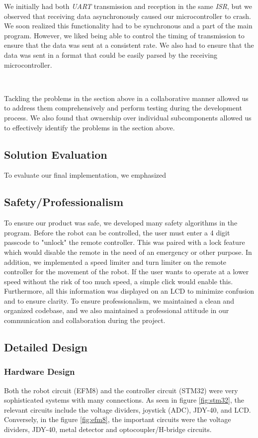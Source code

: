 \documentclass{article}
\begin{document}
We initially had both \textit{UART} transmission and reception in the same \textit{ISR}, but we observed that receiving data asynchronously
caused our microcontroller to crash. We soon realized this functionality had to be synchronous and a part of the main program. However, we liked being able to control the timing of
transmission to ensure that the data was sent at a consistent rate. We also had to ensure that the data was sent in a format that could be easily parsed by the receiving microcontroller.

\

Tackling the problems in the section above in a collaborative manner allowed us to address them comprehensively and perform
testing during the development process. We also found that ownership over individual subcomponents allowed us to effectively identify the problems in the section above.

\subsection{Solution Evaluation}

To evaluate our final implementation, we emphasized

\subsection{Safety/Professionalism}

To ensure our product was safe, we developed many safety algorithms in the program. Before the robot can be controlled, the user must enter a 4 digit passcode to "unlock" the remote controller. This was paired with a lock feature which would disable the remote in the need of an emergency or other purpose.
In addition, we implemented a speed limiter and turn limiter on the remote controller for the movement of the robot. If the user wants to operate at a lower speed without the risk of too much speed, a simple click would enable this.
Furthermore, all this information was displayed on an LCD to minimize confusion and to ensure clarity. To ensure professionalism, we maintained a clean and organized codebase, and we also maintained a professional attitude in our communication and collaboration during the project.

\subsection{Detailed Design}

\subsubsection{Hardware Design}
Both the robot circuit (EFM8) and the controller circuit (STM32) were very sophisticated systems with many connections. As seen in figure \ref{fig:stm32}, the relevant circuits
include the voltage dividers, joystick (ADC), JDY-40, and LCD. Conversely, in the figure \ref{fig:efm8}, the important circuits
were the voltage dividers, JDY-40, metal detector and optocoupler/H-bridge circuits.
\end{document}
